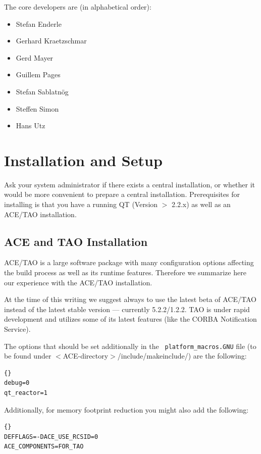 \documentclass[10pt]{book}
\begin{document}
The \miro core developers are (in alphabetical order):
\begin{itemize}
  \item Stefan Enderle
  \item Gerhard Kraetzschmar
  \item Gerd Mayer
  \item Guillem Pages
  \item Stefan Sablatn\"og
  \item Steffen Simon
  \item Hans Utz
\end{itemize}

\section{Installation and Setup}

Ask your system administrator if there exists a central installation,
or whether it would be more convenient to prepare a central
installation. Prerequisites for installing \miro is that you have a
running QT (Version $>$ 2.2.x) as well as an ACE/TAO installation.

\subsection{ACE and TAO Installation}
\label{sec::aceInstall}

ACE/TAO is a large software package with many configuration
options affecting the build process as well as its runtime
features. Therefore we summarize here our experience with the
ACE/TAO installation.

At the time of this writing we suggest always to use the
latest beta of ACE/TAO instead of the latest stable version ---
currently 5.2.2/1.2.2. TAO is under rapid development and \miro
utilizes some of its latest features (like the CORBA Notification
Service).

The options that should be set additionally in the {\tt
  platform\_macros.GNU} file (to be found under
$<$ACE-directory$>$/include/makeinclude/) are the following:

\begin{lstlisting}[frame=tb]{}
debug=0
qt_reactor=1
\end{lstlisting}

Additionally, for memory footprint reduction you might also add the
following:

\begin{lstlisting}[frame=tb]{}
DEFFLAGS=-DACE_USE_RCSID=0
ACE_COMPONENTS=FOR_TAO
\end{lstlisting}
\end{document}
